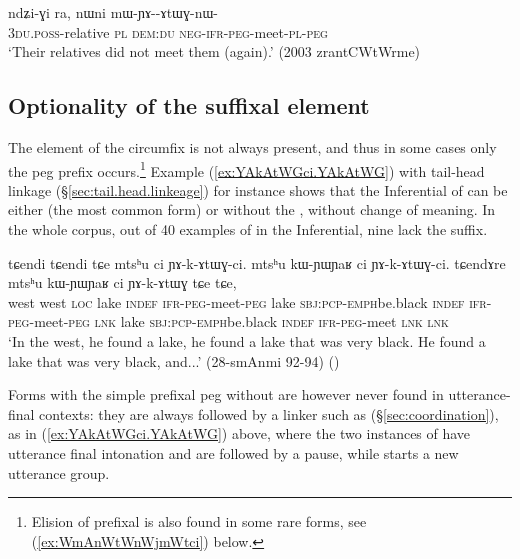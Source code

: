 \begin{exe}
\ex \label{ex:mWYAkAtWGnWci}
\gll  ndʑi-ɣi ra, nɯni mɯ-ɲɤ--ɤtɯɣ-nɯ- \\
\textsc{3du}.\textsc{poss}-relative \textsc{pl} \textsc{dem}:\textsc{du} \textsc{neg}-\textsc{ifr}-\textsc{peg}-meet-\textsc{pl}-\textsc{peg} \\
\glt `Their relatives did not meet them (again).' (2003 zrantCWtWrme)
\end{exe}


\subsection{Optionality of the suffixal element} \label{sec:peg.circumfix.optionality}
The  element of the circumfix is not always present, and thus in some cases only the peg prefix  occurs.\footnote{
Elision of prefixal  is also found in some rare forms, see (\ref{ex:WmAnWtWnWjmWtci}) below. 
} Example (\ref{ex:YAkAtWGci.YAkAtWG}) with tail-head linkage (§\ref{sec:tail.head.linkeage}) for instance shows that the Inferential of  can be either  (the most common form) or  without the , without change of meaning.  In the whole corpus, out of 40 examples of  in the Inferential, nine lack the  suffix.

\begin{exe}
	\ex \label{ex:YAkAtWGci.YAkAtWG}
	\gll  tɕendi tɕendi tɕe mtsʰu ci ɲɤ-k-ɤtɯɣ-ci. mtsʰu kɯ-ɲɯ\redp{}ɲaʁ ci ɲɤ-k-ɤtɯɣ-ci. tɕendɤre mtsʰu kɯ-ɲɯ\redp{}ɲaʁ ci ɲɤ-k-ɤtɯɣ tɕe tɕe, \\
	west west \textsc{loc}  lake \textsc{indef} \textsc{ifr}-\textsc{peg}-meet-\textsc{peg}  lake \textsc{sbj}:\textsc{pcp}-\textsc{emph}\redp{}be.black \textsc{indef} \textsc{ifr}-\textsc{peg}-meet-\textsc{peg} \textsc{lnk} lake \textsc{sbj}:\textsc{pcp}-\textsc{emph}\redp{}be.black \textsc{indef} \textsc{ifr}-\textsc{peg}-meet \textsc{lnk} \textsc{lnk} \\
	\glt `In the west, he found a lake, he found a lake that was very black. He found a lake that was very black, and...' (28-smAnmi 92-94) ()
\end{exe}

Forms with the simple prefixal peg  without  are however never found in utterance-final contexts: they are always followed by a linker such as  (§\ref{sec:coordination}), as in (\ref{ex:YAkAtWGci.YAkAtWG}) above, where the two instances of  have utterance final intonation and are followed by a pause, while  starts a new utterance group. 



